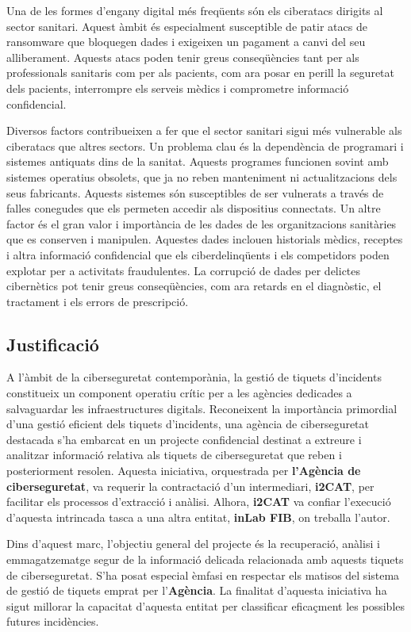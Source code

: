 Una de les formes d'engany digital més freqüents són els ciberatacs dirigits al sector sanitari. Aquest àmbit és especialment susceptible de patir atacs de ransomware que bloquegen dades i exigeixen un pagament a canvi del seu alliberament. Aquests atacs poden tenir greus conseqüències tant per als professionals sanitaris com per als pacients, com ara posar en perill la seguretat dels pacients, interrompre els serveis mèdics i comprometre informació confidencial.

Diversos factors contribueixen a fer que el sector sanitari sigui més vulnerable als ciberatacs que altres sectors. Un problema clau és la dependència de programari i sistemes antiquats dins de la sanitat. Aquests programes funcionen sovint amb sistemes operatius obsolets, que ja no reben manteniment ni actualitzacions dels seus fabricants. Aquests sistemes són susceptibles de ser vulnerats a través de falles conegudes que els permeten accedir als dispositius connectats. Un altre factor és el gran valor i importància de les dades de les organitzacions sanitàries que es conserven i manipulen. Aquestes dades inclouen historials mèdics, receptes i altra informació confidencial que els ciberdelinqüents i els competidors poden explotar per a activitats fraudulentes. La corrupció de dades per delictes cibernètics pot tenir greus conseqüències, com ara retards en el diagnòstic, el tractament i els errors de prescripció.

\subsection{Justificació}
A l'àmbit de la ciberseguretat contemporània, la gestió de tiquets d'incidents constitueix un component operatiu crític per a les agències dedicades a salvaguardar les infraestructures digitals. Reconeixent la importància primordial d'una gestió eficient dels tiquets d'incidents, una agència de ciberseguretat destacada s'ha embarcat en un projecte confidencial destinat a extreure i analitzar informació relativa als tiquets de ciberseguretat que reben i posteriorment resolen. Aquesta iniciativa, orquestrada per \textbf{l'Agència de ciberseguretat}, va requerir la contractació d'un intermediari, \textbf{i2CAT}, per facilitar els processos d'extracció i anàlisi. Alhora, \textbf{i2CAT} va confiar l'execució d'aquesta intrincada tasca a una altra entitat, \textbf{inLab FIB}, on treballa l'autor.

Dins d'aquest marc, l'objectiu general del projecte és la recuperació, anàlisi i emmagatzematge segur de la informació delicada relacionada amb aquests tiquets de ciberseguretat. S'ha posat especial èmfasi en respectar els matisos del sistema de gestió de tiquets emprat per l'\textbf{Agència}. La finalitat d'aquesta iniciativa ha sigut millorar la capacitat d'aquesta entitat per classificar eficaçment les possibles futures incidències.

